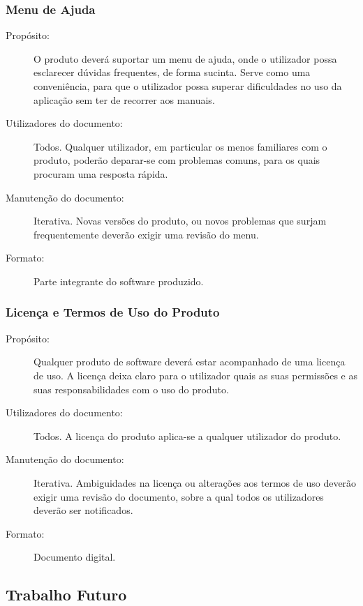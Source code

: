 \documentclass[12pt,a4paper]{article}
\begin{document}
    \subsubsection{Menu de Ajuda}
      \begin{description}
        \item[Propósito:]O produto deverá suportar um menu de ajuda, onde o utilizador possa esclarecer dúvidas frequentes, de forma sucinta. Serve como uma conveniência, para que o utilizador possa superar dificuldades no uso da aplicação sem ter de recorrer aos manuais.

        \item[Utilizadores do documento:]Todos. Qualquer utilizador, em particular os menos familiares com o produto, poderão deparar-se com problemas comuns, para os quais procuram uma resposta rápida.
        \item[Manutenção do documento:]Iterativa. Novas versões do produto, ou novos problemas que surjam frequentemente deverão exigir uma revisão do menu.
        \item[Formato:]Parte integrante do software produzido.
      \end{description}

    \subsubsection{Licença e Termos de Uso do Produto}
      \begin{description}
        \item[Propósito:]Qualquer produto de software deverá estar acompanhado de uma licença de uso. A licença deixa claro para o utilizador quais as suas permissões e as suas responsabilidades com o uso do produto.
        \item[Utilizadores do documento:]Todos. A licença do produto aplica-se a qualquer utilizador do produto.
        \item[Manutenção do documento:]Iterativa. Ambiguidades na licença ou alterações aos termos de uso deverão exigir uma revisão do documento, sobre a qual todos os utilizadores deverão ser notificados.
        \item[Formato:]Documento digital.
      \end{description}

  \subsection{Trabalho Futuro}
\end{document}
